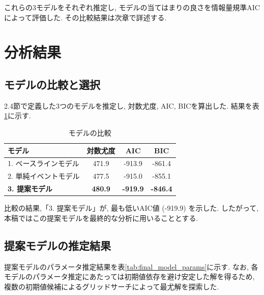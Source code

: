 \documentclass[a4paper, 10pt]{jarticle}
\begin{document}
これらの3モデルをそれぞれ推定し, モデルの当てはまりの良さを情報量規準AICによって評価した. 
その比較結果は次章で詳述する. 

\section{分析結果}
\subsection{モデルの比較と選択}
2.4節で定義した3つのモデルを推定し, 対数尤度, AIC, BICを算出した. 
結果を表\ref{tab:model_comparison}に示す. 
\begin{table}[H]
  \centering
  \caption{モデルの比較}
  \label{tab:model_comparison}
  \small
  \begin{tabular}{lccc}
    \hline
    モデル & 対数尤度 & AIC & BIC \\
    \hline
    1. ベースラインモデル & 471.9 & -913.9 & -861.4 \\
    2. 単純イベントモデル & 477.5 & -915.0 & -855.1 \\
    \textbf{3. 提案モデル} & \textbf{480.9} & \textbf{-919.9} & \textbf{-846.4} \\
    \hline
  \end{tabular}
\end{table}
比較の結果,「3. 提案モデル」が, 最も低いAIC値 (-919.9) を示した. 
したがって, 本稿ではこの提案モデルを最終的な分析に用いることとする. 
\subsection{提案モデルの推定結果}
提案モデルのパラメータ推定結果を表\ref{tab:final_model_params}に示す. 
なお, 各モデルのパラメータ推定にあたっては初期値依存を避け安定した解を得るため, 複数の初期値候補によるグリッドサーチによって最尤解を探索した.
\end{document}
